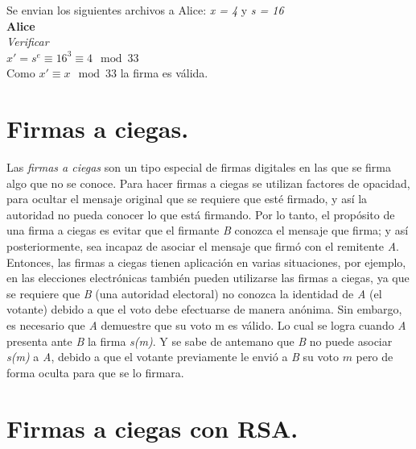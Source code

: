 Se envian los siguientes archivos a Alice: \textit{ x = 4 } y \textit{ s = 16 } \\

\textbf{Alice}\\
\textit{Verificar} \\

\textit{$ x ' = s^{e} \equiv 16^{3} \equiv 4 \mod 33 $}\\

Como \textit{$ x ' \equiv x \mod 33 $} la firma es válida.\\



\section{Firmas a ciegas. }

Las \textit{firmas a ciegas} son un tipo especial de firmas digitales en las que se firma algo que no se conoce. Para hacer firmas a ciegas se utilizan factores de opacidad, para ocultar el mensaje original que se requiere que esté firmado, y así la autoridad no pueda conocer lo que está firmando.
Por lo tanto, el propósito de una firma a ciegas es evitar que el firmante \textit{B} conozca el mensaje que firma; y así posteriormente, sea incapaz de asociar el mensaje que firmó con el remitente \textit{A}. Entonces, las firmas a ciegas tienen aplicación en varias situaciones, por ejemplo, en las elecciones electrónicas también pueden utilizarse las firmas a ciegas, ya que se requiere que \textit{B} (una autoridad electoral) no conozca la identidad de \textit{A} (el votante) debido a que el voto debe efectuarse de manera anónima. Sin embargo, es necesario que \textit{A} demuestre que su voto m es válido. Lo cual se logra cuando \textit{A} presenta ante \textit{B} la firma \textit{s(m)}. Y se sabe de antemano que \textit{B} no puede asociar \textit{s(m)} a \textit{A}, debido a que el votante previamente le envió a \textit{B} su voto $m$ pero de forma oculta para que se lo firmara. ~\cite{ciegas}



\section{Firmas a ciegas con RSA. }

